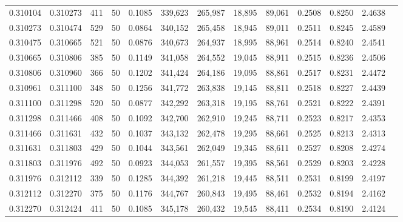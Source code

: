 \begin{tabular}{rrrrrrrrrrrrr}
0.310104 & 0.310273 &   411 &  50 &                                     0.1085 & 339,623 & 265,987 &  18,895 &  89,061 & 0.2508 & 0.8250 & 2.4638 \\
0.310273 & 0.310474 &   529 &  50 &                                     0.0864 & 340,152 & 265,458 &  18,945 &  89,011 & 0.2511 & 0.8245 & 2.4589 \\
0.310475 & 0.310665 &   521 &  50 &                                     0.0876 & 340,673 & 264,937 &  18,995 &  88,961 & 0.2514 & 0.8240 & 2.4541 \\
0.310665 & 0.310806 &   385 &  50 &                                     0.1149 & 341,058 & 264,552 &  19,045 &  88,911 & 0.2515 & 0.8236 & 2.4506 \\
0.310806 & 0.310960 &   366 &  50 &                                     0.1202 & 341,424 & 264,186 &  19,095 &  88,861 & 0.2517 & 0.8231 & 2.4472 \\
0.310961 & 0.311100 &   348 &  50 &                                     0.1256 & 341,772 & 263,838 &  19,145 &  88,811 & 0.2518 & 0.8227 & 2.4439 \\
0.311100 & 0.311298 &   520 &  50 &                                     0.0877 & 342,292 & 263,318 &  19,195 &  88,761 & 0.2521 & 0.8222 & 2.4391 \\
0.311298 & 0.311466 &   408 &  50 &                                     0.1092 & 342,700 & 262,910 &  19,245 &  88,711 & 0.2523 & 0.8217 & 2.4353 \\
0.311466 & 0.311631 &   432 &  50 &                                     0.1037 & 343,132 & 262,478 &  19,295 &  88,661 & 0.2525 & 0.8213 & 2.4313 \\
0.311631 & 0.311803 &   429 &  50 &                                     0.1044 & 343,561 & 262,049 &  19,345 &  88,611 & 0.2527 & 0.8208 & 2.4274 \\
0.311803 & 0.311976 &   492 &  50 &                                     0.0923 & 344,053 & 261,557 &  19,395 &  88,561 & 0.2529 & 0.8203 & 2.4228 \\
0.311976 & 0.312112 &   339 &  50 &                                     0.1285 & 344,392 & 261,218 &  19,445 &  88,511 & 0.2531 & 0.8199 & 2.4197 \\
0.312112 & 0.312270 &   375 &  50 &                                     0.1176 & 344,767 & 260,843 &  19,495 &  88,461 & 0.2532 & 0.8194 & 2.4162 \\
0.312270 & 0.312424 &   411 &  50 &                                     0.1085 & 345,178 & 260,432 &  19,545 &  88,411 & 0.2534 & 0.8190 & 2.4124 \\

\end{tabular}
